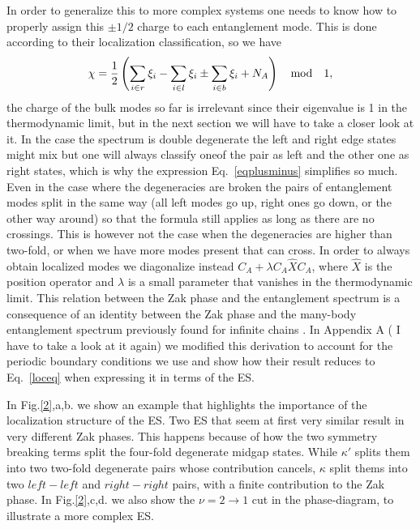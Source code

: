 \documentclass[twocolumn,amsmath,longbibliography,amssymb,superscriptaddress]{revtex4-1}
\newcommand{\carlos}[1]{{\color{red} #1}}
\begin{document}
In order to generalize this to more complex systems one needs to know how to properly assign this $\pm 1/2$ charge to each entanglement mode. This is done according to their localization classification, so we have
\begin{equation}
\chi = \frac{1}{2} \left( \sum_{i\in r}\xi_i-\sum_{i\in l}\xi_i \pm \sum_{i\in b}\xi_i  + N_A \right) \quad {\rm mod} \quad 1,
\label{loceq}
\end{equation}
the charge of the bulk modes so far is irrelevant since their eigenvalue is 1 in the thermodynamic limit, but in the next section we will have to take a closer look at it.  In the case the spectrum is double degenerate the left and right edge states might mix but one will always classify oneof the pair as left and the other one as right states, which is why the expression Eq.~\eqref{eqplusminus} simplifies so much. Even in the case where the degeneracies are broken the pairs of entanglement modes split in the same way (all left modes go up, right ones go down, or the other way around) so that the formula still applies as long as there are no crossings. This is however not the case when the degeneracies are higher than two-fold, or when we have more modes present that can cross. In order to always obtain localized modes we diagonalize instead $C_A + \lambda C_A\hat{X}C_A$, where $\hat{X}$ is the position operator and $\lambda$ is a small parameter that vanishes in the thermodynamic limit. This relation between the Zak phase and the entanglement spectrum is a consequence of an identity between the Zak phase and the many-body entanglement spectrum previously found for infinite chains \cite{Zaletel2014}. In Appendix A (\carlos{I have to take a look at it again}) we modified this derivation to account for the periodic boundary conditions we use and show how their result reduces to Eq.~\eqref{loceq} when expressing it in terms of the ES.

In Fig.\ref{2},a,b. we show an example that highlights the importance of the localization structure of the ES. Two ES that seem at first very similar result in very different Zak phases. This happens because of how the two symmetry breaking terms split the four-fold degenerate midgap states. While $\kappa'$ splits them into two two-fold degenerate pairs whose contribution cancels, $\kappa$ split thems into two $left-left$ and $right-right$ pairs, with a finite contribution to the Zak phase. In Fig.\ref{2},c,d. we also show the $\nu = 2 \rightarrow 1$ cut in the phase-diagram, to illustrate a more complex ES. 
\end{document}

